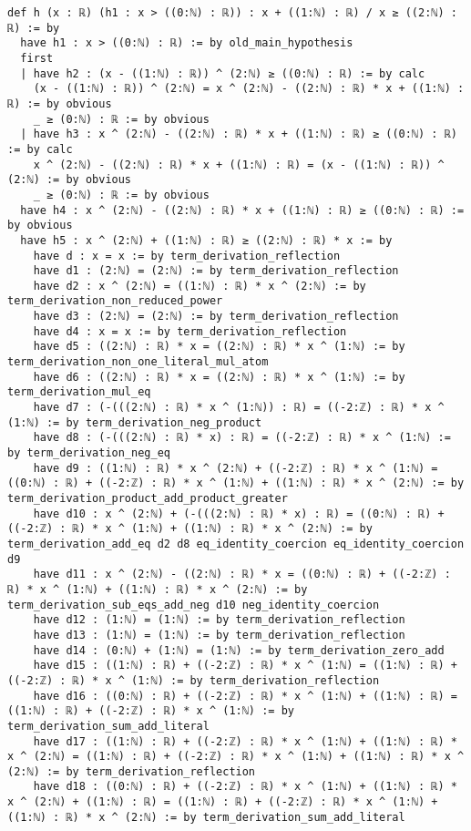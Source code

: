 \documentclass{article}
\begin{document}
\begin{tcolorbox}[colback=white!10, width=\linewidth]
\begin{lstlisting}[language=Lean4]
def h (x : ℝ) (h1 : x > ((0:ℕ) : ℝ)) : x + ((1:ℕ) : ℝ) / x ≥ ((2:ℕ) : ℝ) := by
  have h1 : x > ((0:ℕ) : ℝ) := by old_main_hypothesis
  first
  | have h2 : (x - ((1:ℕ) : ℝ)) ^ (2:ℕ) ≥ ((0:ℕ) : ℝ) := by calc
    (x - ((1:ℕ) : ℝ)) ^ (2:ℕ) = x ^ (2:ℕ) - ((2:ℕ) : ℝ) * x + ((1:ℕ) : ℝ) := by obvious
    _ ≥ (0:ℕ) : ℝ := by obvious
  | have h3 : x ^ (2:ℕ) - ((2:ℕ) : ℝ) * x + ((1:ℕ) : ℝ) ≥ ((0:ℕ) : ℝ) := by calc
    x ^ (2:ℕ) - ((2:ℕ) : ℝ) * x + ((1:ℕ) : ℝ) = (x - ((1:ℕ) : ℝ)) ^ (2:ℕ) := by obvious
    _ ≥ (0:ℕ) : ℝ := by obvious
  have h4 : x ^ (2:ℕ) - ((2:ℕ) : ℝ) * x + ((1:ℕ) : ℝ) ≥ ((0:ℕ) : ℝ) := by obvious
  have h5 : x ^ (2:ℕ) + ((1:ℕ) : ℝ) ≥ ((2:ℕ) : ℝ) * x := by
    have d : x = x := by term_derivation_reflection
    have d1 : (2:ℕ) = (2:ℕ) := by term_derivation_reflection
    have d2 : x ^ (2:ℕ) = ((1:ℕ) : ℝ) * x ^ (2:ℕ) := by term_derivation_non_reduced_power
    have d3 : (2:ℕ) = (2:ℕ) := by term_derivation_reflection
    have d4 : x = x := by term_derivation_reflection
    have d5 : ((2:ℕ) : ℝ) * x = ((2:ℕ) : ℝ) * x ^ (1:ℕ) := by term_derivation_non_one_literal_mul_atom
    have d6 : ((2:ℕ) : ℝ) * x = ((2:ℕ) : ℝ) * x ^ (1:ℕ) := by term_derivation_mul_eq
    have d7 : (-(((2:ℕ) : ℝ) * x ^ (1:ℕ)) : ℝ) = ((-2:ℤ) : ℝ) * x ^ (1:ℕ) := by term_derivation_neg_product
    have d8 : (-(((2:ℕ) : ℝ) * x) : ℝ) = ((-2:ℤ) : ℝ) * x ^ (1:ℕ) := by term_derivation_neg_eq
    have d9 : ((1:ℕ) : ℝ) * x ^ (2:ℕ) + ((-2:ℤ) : ℝ) * x ^ (1:ℕ) = ((0:ℕ) : ℝ) + ((-2:ℤ) : ℝ) * x ^ (1:ℕ) + ((1:ℕ) : ℝ) * x ^ (2:ℕ) := by term_derivation_product_add_product_greater
    have d10 : x ^ (2:ℕ) + (-(((2:ℕ) : ℝ) * x) : ℝ) = ((0:ℕ) : ℝ) + ((-2:ℤ) : ℝ) * x ^ (1:ℕ) + ((1:ℕ) : ℝ) * x ^ (2:ℕ) := by term_derivation_add_eq d2 d8 eq_identity_coercion eq_identity_coercion d9
    have d11 : x ^ (2:ℕ) - ((2:ℕ) : ℝ) * x = ((0:ℕ) : ℝ) + ((-2:ℤ) : ℝ) * x ^ (1:ℕ) + ((1:ℕ) : ℝ) * x ^ (2:ℕ) := by term_derivation_sub_eqs_add_neg d10 neg_identity_coercion
    have d12 : (1:ℕ) = (1:ℕ) := by term_derivation_reflection
    have d13 : (1:ℕ) = (1:ℕ) := by term_derivation_reflection
    have d14 : (0:ℕ) + (1:ℕ) = (1:ℕ) := by term_derivation_zero_add
    have d15 : ((1:ℕ) : ℝ) + ((-2:ℤ) : ℝ) * x ^ (1:ℕ) = ((1:ℕ) : ℝ) + ((-2:ℤ) : ℝ) * x ^ (1:ℕ) := by term_derivation_reflection
    have d16 : ((0:ℕ) : ℝ) + ((-2:ℤ) : ℝ) * x ^ (1:ℕ) + ((1:ℕ) : ℝ) = ((1:ℕ) : ℝ) + ((-2:ℤ) : ℝ) * x ^ (1:ℕ) := by term_derivation_sum_add_literal
    have d17 : ((1:ℕ) : ℝ) + ((-2:ℤ) : ℝ) * x ^ (1:ℕ) + ((1:ℕ) : ℝ) * x ^ (2:ℕ) = ((1:ℕ) : ℝ) + ((-2:ℤ) : ℝ) * x ^ (1:ℕ) + ((1:ℕ) : ℝ) * x ^ (2:ℕ) := by term_derivation_reflection
    have d18 : ((0:ℕ) : ℝ) + ((-2:ℤ) : ℝ) * x ^ (1:ℕ) + ((1:ℕ) : ℝ) * x ^ (2:ℕ) + ((1:ℕ) : ℝ) = ((1:ℕ) : ℝ) + ((-2:ℤ) : ℝ) * x ^ (1:ℕ) + ((1:ℕ) : ℝ) * x ^ (2:ℕ) := by term_derivation_sum_add_literal

\end{lstlisting}
\end{tcolorbox}
\end{document}
